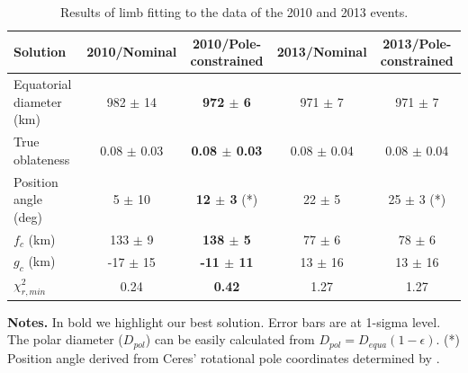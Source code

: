 \documentclass[useAMS,usenatbib]{mn2e}
\begin{document}
\begin{table}
 \centering
 \begin{minipage}{140mm}
  \caption{Results of limb fitting to the data of the 2010 and 2013 events.\label{Tab: results}}
  \begin{tabular}{@{}lcccc}
  \hline
     Solution & 2010/Nominal & \textbf{2010/Pole-constrained} & 2013/Nominal & 2013/Pole-constrained \\
\hline
Equatorial diameter (km) & 982 $\pm$ 14 & \textbf{972 $\pm$ 6}  & 971 $\pm$ 7  & 971 $\pm$ 7\\
True oblateness        & 0.08 $\pm$ 0.03 & \textbf{0.08 $\pm$ 0.03} & 0.08 $\pm$ 0.04 & 0.08 $\pm$ 0.04\\
Position angle (deg)   & 5 $\pm$ 10    & \textbf{12 $\pm$ 3} (*)& 22 $\pm$ 5    & 25 $\pm$ 3 (*)\\
$f_c$ (km)             & 133 $\pm$ 9   & \textbf{138 $\pm$ 5}   & 77 $\pm$ 6    & 78 $\pm$ 6\\
$g_c$ (km)             & -17 $\pm$ 15  & \textbf{-11 $\pm$ 11}  & 13 $\pm$ 16   & 13 $\pm$ 16\\
$\chi^2_{r,min}$       & 0.24          &  \textbf{0.42}         & 1.27          & 1.27\\
\hline
\end{tabular}
\textbf{Notes.} In bold we highlight our best solution. Error bars are at 1-sigma level. The polar diameter ($D_{pol}$) can be easily calculated from $D_{pol}=D_{equa}(1 - \epsilon)$.
(*) Position angle derived from Ceres' rotational pole coordinates determined by \cite{Drummond2014}.
\end{minipage}
\end{table}
\end{document}
